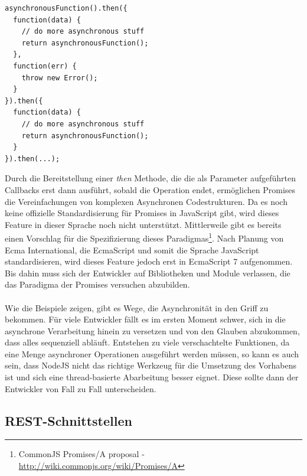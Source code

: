 \vspace{1.8cm}
\begin{lstlisting}[caption=Ausführung von asynchronen Code mit Promises,label=asyncjs]
asynchronousFunction().then({
  function(data) {
    // do more asynchronous stuff
    return asynchronousFunction();
  },
  function(err) {
    throw new Error();
  }
}).then({
  function(data) {
    // do more asynchronous stuff
    return asynchronousFunction();
  }
}).then(...);
\end{lstlisting}
\vspace{0.1cm}

Durch die Bereitstellung einer \textit{then} Methode, die die als Parameter aufgeführten Callbacks erst dann ausführt, sobald die Operation endet, ermöglichen Promises die Vereinfachungen von komplexen Asynchronen Codestrukturen. Da es noch keine offizielle Standardisierung für Promises in JavaScript gibt, wird dieses Feature in dieser Sprache noch nicht unterstützt. Mittlerweile gibt es bereits einen Vorschlag für die Spezifizierung dieses Paradigmas\footnote{CommonJS Promises/A proposal - \url{http://wiki.commonjs.org/wiki/Promises/A}}. Nach Planung von Ecma International, die EcmaScript und somit die Sprache JavaScript standardisieren, wird dieses Feature jedoch erst in EcmaScript 7 aufgenommen. Bis dahin muss sich der Entwickler auf Bibliotheken und Module verlassen, die das Paradigma der Promises versuchen abzubilden.\\
\\
Wie die Beispiele zeigen, gibt es Wege, die Asynchronität in den Griff zu bekommen. Für viele Entwickler fällt es im ersten Moment schwer, sich in die asynchrone Verarbeitung hinein zu versetzen und von den Glauben abzukommen, dass alles sequenziell abläuft. Entstehen zu viele verschachtelte Funktionen, da eine Menge asynchroner Operationen ausgeführt werden müssen, so kann es auch sein, dass NodeJS nicht das richtige Werkzeug für die Umsetzung des Vorhabens ist und sich eine thread-basierte Abarbeitung besser eignet. Diese sollte dann der Entwickler von Fall zu Fall unterscheiden.

\subsection{REST-Schnittstellen}

